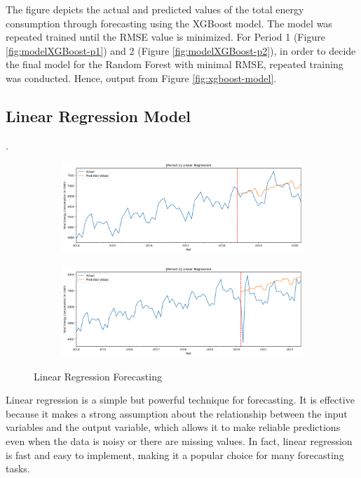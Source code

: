 \documentclass[runningheads]{llncs}
\begin{document}
The figure depicts the actual and predicted values of the total energy consumption through forecasting using the XGBoost model. The model was repeated trained until the RMSE value is minimized. For Period 1 (Figure \ref{fig:modelXGBoost-p1}) and 2 (Figure \ref{fig:modelXGBoost-p2}), in order to decide the final model for the Random Forest with minimal RMSE, repeated training was conducted. Hence, output from Figure \ref{fig:xgboost-model}. 

\subsection{Linear Regression Model}.
\begin{figure}
    \begin{subfigure}[b]{\textwidth}
         \centering
         \includegraphics[width=\textwidth]{lr/p1-lr.png}
         \caption{}
         \label{fig:modelLR-p1}
    \end{subfigure}
    \begin{subfigure}[b]{\textwidth}
         \centering
         \includegraphics[width=\textwidth]{lr/p2-lr.png}
         \caption{}
         \label{fig:modelLR-p2}
    \end{subfigure}
    \caption{Linear Regression Forecasting}
    \label{fig:lr-model}
\end{figure}
Linear regression is a simple but powerful technique for forecasting. It is effective because it makes a strong assumption about the relationship between the input variables and the output variable, which allows it to make reliable predictions even when the data is noisy or there are missing values. In fact, linear regression is fast and easy to implement, making it a popular choice for many forecasting tasks.
\end{document}
